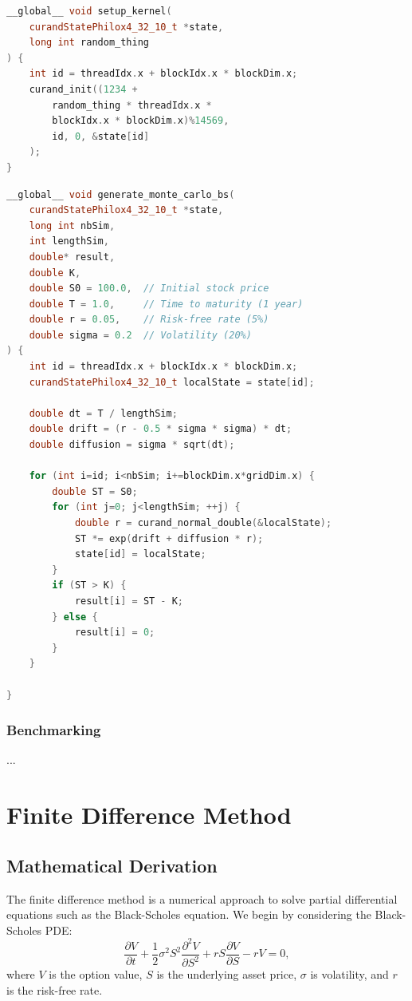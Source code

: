 \documentclass[12pt,a4paper]{report}
\begin{document}
\begin{tcolorbox}[colback=green!5!white, colframe=green!75!black, title=Cuda random number generator]
\begin{lstlisting}[language=C++]
__global__ void setup_kernel(
    curandStatePhilox4_32_10_t *state, 
    long int random_thing
) {
    int id = threadIdx.x + blockIdx.x * blockDim.x;
    curand_init((1234 + 
        random_thing * threadIdx.x * 
        blockIdx.x * blockDim.x)%14569, 
        id, 0, &state[id]
    );
}
\end{lstlisting}
\end{tcolorbox}

\begin{tcolorbox}[colback=blue!5!white, colframe=blue!50!black, title=Cuda compute simulation]
\begin{lstlisting}[language=C++]
__global__ void generate_monte_carlo_bs(
    curandStatePhilox4_32_10_t *state,
    long int nbSim,
    int lengthSim,
    double* result,
    double K,
    double S0 = 100.0,  // Initial stock price
    double T = 1.0,     // Time to maturity (1 year)
    double r = 0.05,    // Risk-free rate (5%)
    double sigma = 0.2  // Volatility (20%)
) {
    int id = threadIdx.x + blockIdx.x * blockDim.x;
    curandStatePhilox4_32_10_t localState = state[id];

    double dt = T / lengthSim;
    double drift = (r - 0.5 * sigma * sigma) * dt;
    double diffusion = sigma * sqrt(dt);

    for (int i=id; i<nbSim; i+=blockDim.x*gridDim.x) {
        double ST = S0;
        for (int j=0; j<lengthSim; ++j) {
            double r = curand_normal_double(&localState);
            ST *= exp(drift + diffusion * r);
            state[id] = localState;
        }
        if (ST > K) {
            result[i] = ST - K;
        } else {
            result[i] = 0;
        }
    }

}
\end{lstlisting}
\end{tcolorbox}
\subsubsection{Benchmarking}
...

\section{Finite Difference Method}

\subsection{Mathematical Derivation}
The finite difference method is a numerical approach to solve partial differential equations such as the Black-Scholes equation. We begin by considering the Black-Scholes PDE:
\[
\frac{\partial V}{\partial t} + \frac{1}{2} \sigma^2 S^2 \frac{\partial^2 V}{\partial S^2} + rS \frac{\partial V}{\partial S} - rV = 0,
\]
where \( V \) is the option value, \( S \) is the underlying asset price, \( \sigma \) is volatility, and \( r \) is the risk-free rate.  
\end{document}
